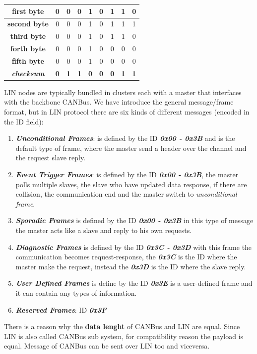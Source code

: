 \begin{enumerate}[nosep]
\begin{center}
\begin{tabular}{ | c |  c |  c |  c |  c |  c |  c |  c |  c | }
            \textbf{first byte} & 0 & 0 & 0 & 1 & 0 & 1 & 1 & 0 \\ \hline
            \textbf{second byte} & 0 & 0 & 0 & 1 & 0 & 1 & 1 & 1 \\ \hline
            \textbf{third byte} & 0 & 0 & 0 & 1 & 0 & 1 & 1 & 0 \\ \hline
            \textbf{forth byte} & 0 & 0 & 0 & 1 & 0 & 0 & 0 & 0 \\ \hline
            \textbf{fifth byte} & 0 & 0 & 0 & 1 & 0 & 0 & 0 & 0 \\ \hline
            \textbf{\textit{checksum}} & \textbf{0} & \textbf{1} & \textbf{1} & \textbf{0} & \textbf{0} & \textbf{0} & \textbf{1} & \textbf{1} \\ \hline
        \end{tabular}
    \end{center}
\end{enumerate}
LIN nodes are typically bundled in clusters each with a master that interfaces with the backbone CANBus. We have introduce the general message/frame format, but in LIN protocol there are six kinds of different messages (encoded in the ID field):
\begin{enumerate}[nosep]
    \item \textbf{\textit{Unconditional Frames}}: is defined by the ID \textbf{\textit{0x00 - 0x3B}} and is the default type of frame, where the master send a header over the channel and the request slave reply.
    \item \textbf{\textit{Event Trigger Frames}}: is defined by the ID \textbf{\textit{0x00 - 0x3B}}, the master polls multiple slaves, the slave who have updated data response, if there are collision, the communication end and the master switch to \textit{unconditional frame}.
    \item \textbf{\textit{Sporadic Frames}} is defined by the ID \textbf{\textit{0x00 - 0x3B}} in this type of message the master acts like a slave and reply to his own requests.
    \item \textbf{\textit{Diagnostic Frames}} is defined by the ID \textbf{\textit{0x3C - 0x3D}} with this frame the communication becomes request-response, the \textbf{\textit{0x3C}} is the ID where the master make the request, instead the \textbf{\textit{0x3D}} is the ID where the slave reply.
    \item \textbf{\textit{User Defined Frames}} is define by the ID \textbf{\textit{0x3E}} is a user-defined frame and it can contain any types of information.
    \item \textbf{\textit{Reserved Frames}}: ID \textbf{\textit{0x3F}}
\end{enumerate}
There is a reason why the \textbf{data lenght} of CANBus and LIN are equal. Since LIN is also called CANBus sub system, for compatibility reason the payload is equal. Message of CANBus can be sent over LIN too and viceversa.

